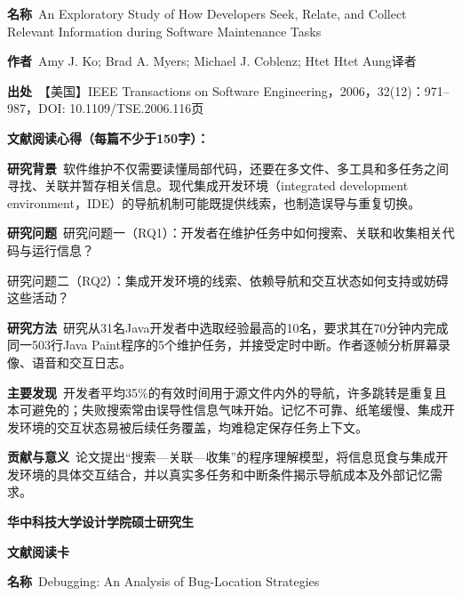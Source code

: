 \noindent\textbf{名称}\ An Exploratory Study of How Developers Seek, Relate, and Collect Relevant Information during Software Maintenance Tasks\par
\noindent\textbf{作者}\ Amy J. Ko; Brad A. Myers; Michael J. Coblenz; Htet Htet Aung\quad 译者\par
\noindent\textbf{出处}\ 【美国】IEEE Transactions on Software Engineering，2006，32(12)：971–987，DOI: 10.1109/TSE.2006.116\quad 页\par
\vspace{0.35em}
\noindent\textbf{文献阅读心得（每篇不少于150字）：}\par
\noindent\textbf{研究背景}\ 软件维护不仅需要读懂局部代码，还要在多文件、多工具和多任务之间寻找、关联并暂存相关信息。现代集成开发环境（integrated development environment，IDE）的导航机制可能既提供线索，也制造误导与重复切换。\par
\noindent\textbf{研究问题}\ 研究问题一（RQ1）：开发者在维护任务中如何搜索、关联和收集相关代码与运行信息？\par
研究问题二（RQ2）：集成开发环境的线索、依赖导航和交互状态如何支持或妨碍这些活动？\par
\noindent\textbf{研究方法}\ 研究从31名Java开发者中选取经验最高的10名，要求其在70分钟内完成同一503行Java Paint程序的5个维护任务，并接受定时中断。作者逐帧分析屏幕录像、语音和交互日志。\par
\noindent\textbf{主要发现}\ 开发者平均35\%的有效时间用于源文件内外的导航，许多跳转是重复且本可避免的；失败搜索常由误导性信息气味开始。记忆不可靠、纸笔缓慢、集成开发环境的交互状态易被后续任务覆盖，均难稳定保存任务上下文。\par
\noindent\textbf{贡献与意义}\ 论文提出“搜索—关联—收集”的程序理解模型，将信息觅食与集成开发环境的具体交互结合，并以真实多任务和中断条件揭示导航成本及外部记忆需求。\par
\clearpage
\begin{center}
{\songti\bfseries\fontsize{18.5pt}{27.75pt}\selectfont 华中科技大学设计学院硕士研究生\par}
{\songti\bfseries\fontsize{18.5pt}{27.75pt}\selectfont 文献阅读卡\par}
\end{center}
\vspace{0.25em}
\noindent\underline{}\par
\vspace{0.35em}
\noindent\textbf{名称}\ Debugging: An Analysis of Bug-Location Strategies\par

